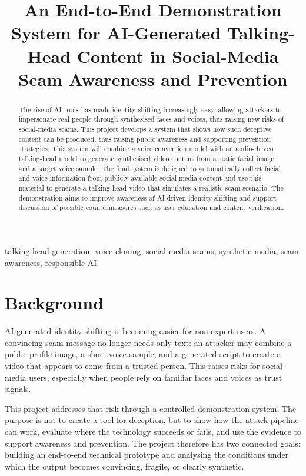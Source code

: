 \documentclass[10pt,conference]{IEEEtran}
\title{An End-to-End Demonstration System for AI-Generated Talking-Head Content in Social-Media Scam Awareness and Prevention}
\author{\IEEEauthorblockN{Alice / Xinran Yang}
\IEEEauthorblockA{AI Project Proposal Draft}}
\begin{document}
\maketitle

\begin{abstract}
The rise of AI tools has made identity shifting increasingly easy, allowing attackers to impersonate real people through synthesised faces and voices, thus raising new risks of social-media scams. This project develops a system that shows how such deceptive content can be produced, thus raising public awareness and supporting prevention strategies. This system will combine a voice conversion model with an audio-driven talking-head model to generate synthesised video content from a static facial image and a target voice sample. The final system is designed to automatically collect facial and voice information from publicly available social-media content and use this material to generate a talking-head video that simulates a realistic scam scenario. The demonstration aims to improve awareness of AI-driven identity shifting and support discussion of possible countermeasures such as user education and content verification.
\end{abstract}

\begin{IEEEkeywords}
talking-head generation, voice cloning, social-media scams, synthetic media, scam awareness, responsible AI
\end{IEEEkeywords}

\section{Background}
AI-generated identity shifting is becoming easier for non-expert users. A convincing scam message no longer needs only text: an attacker may combine a public profile image, a short voice sample, and a generated script to create a video that appears to come from a trusted person. This raises risks for social-media users, especially when people rely on familiar faces and voices as trust signals.

This project addresses that risk through a controlled demonstration system. The purpose is not to create a tool for deception, but to show how the attack pipeline can work, evaluate where the technology succeeds or fails, and use the evidence to support awareness and prevention. The project therefore has two connected goals: building an end-to-end technical prototype and analysing the conditions under which the output becomes convincing, fragile, or clearly synthetic.
\end{document}
